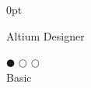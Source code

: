 \documentclass[a4paper]{article}
\begin{document}
\begin{adjustwidth}{\parindent}{0pt}
\begin{minipage}[t]{0.25\textwidth}
  \begin{minipage}{0.65\textwidth}
   \small{Altium Designer}
 \end{minipage}
 \begin{minipage}{0.3\textwidth}
   \centering $\mdlgblkcircle$ $\mdlgwhtcircle$ $\mdlgwhtcircle$ \\  \footnotesize{Basic}
 \end{minipage} \\ \hspace{0pt} \\

\end{minipage}
\end{adjustwidth}
\end{document}
